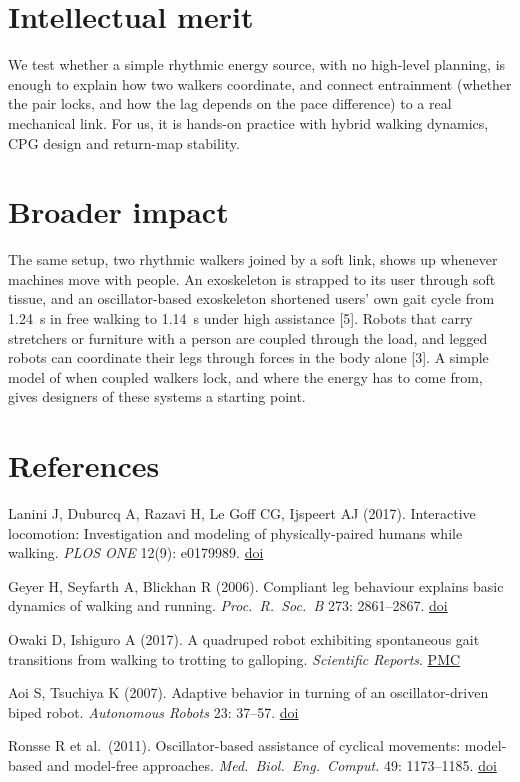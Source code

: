 \documentclass[11pt]{article}
\begin{document}
\section*{Intellectual merit}

We test whether a simple rhythmic energy source, with no high-level planning, is enough to explain how two walkers coordinate, and connect entrainment (whether the pair locks, and how the lag depends on the pace difference) to a real mechanical link. For us, it is hands-on practice with hybrid walking dynamics, CPG design and return-map stability.

\section*{Broader impact}

The same setup, two rhythmic walkers joined by a soft link, shows up whenever machines move with people. An exoskeleton is strapped to its user through soft tissue, and an oscillator-based exoskeleton shortened users' own gait cycle from 1.24~s in free walking to 1.14~s under high assistance [5]. Robots that carry stretchers or furniture with a person are coupled through the load, and legged robots can coordinate their legs through forces in the body alone [3]. A simple model of when coupled walkers lock, and where the energy has to come from, gives designers of these systems a starting point.

\section*{References}
{\small
\begin{enumerate}[label={[\arabic*]},leftmargin=*,itemsep=0pt]
  \item Lanini J, Duburcq A, Razavi H, Le Goff CG, Ijspeert AJ (2017). Interactive locomotion: Investigation and modeling of physically-paired humans while walking. \textit{PLOS ONE} 12(9): e0179989. \href{https://doi.org/10.1371/journal.pone.0179989}{doi}
  \item Geyer H, Seyfarth A, Blickhan R (2006). Compliant leg behaviour explains basic dynamics of walking and running. \textit{Proc.\ R.\ Soc.\ B} 273: 2861--2867. \href{https://doi.org/10.1098/rspb.2006.3637}{doi}
  \item Owaki D, Ishiguro A (2017). A quadruped robot exhibiting spontaneous gait transitions from walking to trotting to galloping. \textit{Scientific Reports}. \href{https://pmc.ncbi.nlm.nih.gov/articles/PMC5428244}{PMC}
  \item Aoi S, Tsuchiya K (2007). Adaptive behavior in turning of an oscillator-driven biped robot. \textit{Autonomous Robots} 23: 37--57. \href{https://doi.org/10.1007/s10514-007-9029-8}{doi}
  \item Ronsse R et al.\ (2011). Oscillator-based assistance of cyclical movements: model-based and model-free approaches. \textit{Med.\ Biol.\ Eng.\ Comput.} 49: 1173--1185. \href{https://doi.org/10.1007/s11517-011-0816-1}{doi}
\end{enumerate}
}
\end{document}
